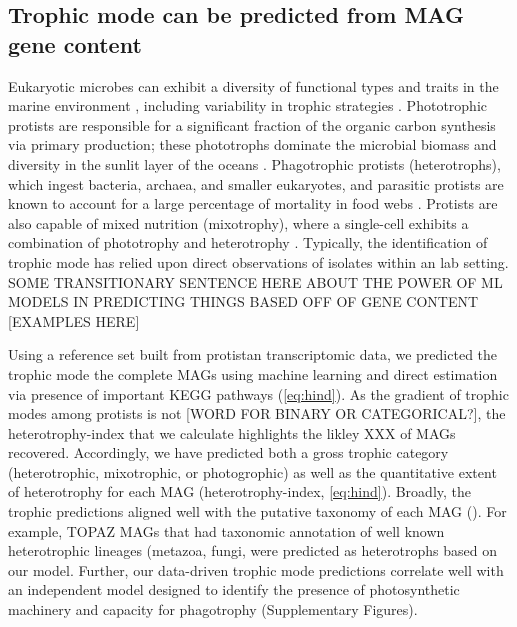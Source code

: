 \documentclass[12pt]{article}
\numberwithin{equation}{section}
\begin{document}
\subsection*{Trophic mode can be predicted from MAG gene content}

Eukaryotic microbes can exhibit a diversity of functional types and traits in the marine environment \citep{Worden2015}, including variability in trophic strategies \citep{Caron2011Marine}. Phototrophic protists are responsible for a significant fraction of the organic carbon synthesis via primary production; these phototrophs dominate the microbial biomass and diversity in the sunlit layer of the oceans \citep{Worden2015}. Phagotrophic protists (heterotrophs), which ingest bacteria, archaea, and smaller eukaryotes, and parasitic protists are known to account for a large percentage of mortality in food webs \citep{Sherr_2002, Caron2011Marine, Worden2015}. Protists are also capable of mixed nutrition (mixotrophy), where a single-cell exhibits a combination of phototrophy and heterotrophy \citep{Stoecker_2017}. Typically, the identification of trophic mode has relied upon direct observations of isolates within an lab setting. SOME TRANSITIONARY SENTENCE HERE ABOUT THE POWER OF ML MODELS IN PREDICTING THINGS BASED OFF OF GENE CONTENT [EXAMPLES HERE]

Using a reference set built from protistan transcriptomic data, we predicted the trophic mode the complete MAGs using machine learning and direct estimation via presence of important KEGG pathways (\cref{eq:hind}). As the gradient of trophic modes among protists is not [WORD FOR BINARY OR CATEGORICAL?], the heterotrophy-index that we calculate highlights the likley XXX of MAGs recovered. Accordingly, we have predicted both a gross trophic category (heterotrophic, mixotrophic, or photogrophic) as well as the quantitative extent of heterotrophy for each MAG (heterotrophy-index, \cref{eq:hind}). Broadly, the trophic predictions aligned well with the putative taxonomy of each MAG (). For example, TOPAZ MAGs that had taxonomic annotation of well known heterotrophic lineages (metazoa, fungi,  were predicted as heterotrophs based on our model.  Further, our data-driven trophic mode predictions correlate well with an independent model designed to identify the presence of photosynthetic machinery and capacity for phagotrophy \citep{burns2018gene} (Supplementary Figures). %
\end{document}
